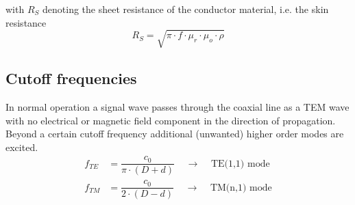 with $R_S$ denoting the sheet resistance of the conductor material,
i.e. the skin resistance
\begin{equation}
R_S = \sqrt{\pi\cdot f\cdot \mu_r \cdot \mu_o \cdot \rho}
\end{equation}

\subsection{Cutoff frequencies}

In normal operation a signal wave passes through the coaxial line as a
TEM wave with no electrical or magnetic field component in the
direction of propagation.  Beyond a certain cutoff frequency
additional (unwanted) higher order modes are excited.
\begin{align}
f_{TE} &= \dfrac{c_0}{\pi\cdot\left(D + d\right)}
\;\;\;\;\rightarrow\;\;\;\; \textrm{TE(1,1) mode}\\
f_{TM} &= \dfrac{c_0}{2\cdot\left(D - d\right)}
\;\;\;\;\rightarrow\;\;\;\; \textrm{TM(n,1) mode}
\end{align}
